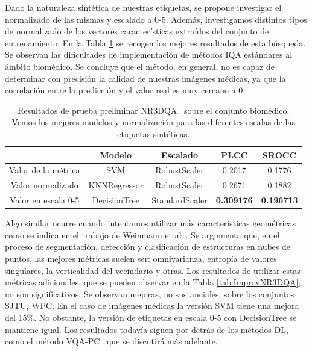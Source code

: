 Dado la naturaleza sintética de nuestras etiquetas, se propone investigar el 
normalizado de las mismas y escalado a 0-5. Además, investigamos distintos 
tipos de normalizado de los vectores características extraídos del conjunto de 
entrenamiento. En la Tabla \ref{tab:MedicalNR3DQA} se recogen los mejores 
resultados de esta búsqueda. 
Se observan las dificultades de implementación de métodos IQA estándares 
al ámbito biomédico. 
Se concluye que el método, en general, no es capaz de 
determinar con precisión la calidad de nuestras imágenes médicas, ya que la correlación 
entre la predicción y el valor real es muy cercano a 0.

\begin{table}[htp]
  \scriptsize
  \begin{center}
    \hspace{-.5cm}
    \begin{tabular}[c]{|c|c|c|c|c|}
      \hline
      \rowcolor[HTML]{FFC702}
      \multicolumn{1}{|c|}{\textbf{Etiqueta Sintética}} & 
      \multicolumn{1}{|c|}{\textbf{Modelo}} & 
      \multicolumn{1}{|c|}{\textbf{Escalado}} & 
      \multicolumn{1}{|c|}{\textbf{PLCC}} &
      \multicolumn{1}{|c|}{\textbf{SROCC}} \\
      \hline
      Valor de la métrica & SVM & RobustScaler & 0.2017 & 0.1776 \\
      \hline
      Valor normalizado & KNNRegressor & RobustScaler & 0.2671 & 0.1882  \\
      \hline
      Valor en escala 0-5 & DecisionTree & StandardScaler & \textbf{0.309176} & \textbf{0.196713} \\
      \hline
    \end{tabular}
  \end{center}
  \caption[Resultados de prueba preliminar NR3DQA sobre el conjunto biomédico.]
  {Resultados de prueba preliminar NR3DQA~\cite{NR3DQA} sobre el conjunto biomédico. 
  Vemos los mejores modelos y normalización para las diferentes escalas de las etiquetas sintéticas.
  }
  \label{tab:MedicalNR3DQA}
\end{table}

Algo similar ocurre cuando intentamos utilizar más características geométricas
como se indica en el trabajo de Weinmann et al~\cite{3DNSSMetrics}. Se argumenta que, en el proceso de segmentación, 
detección y clasificación de estructuras en nubes de puntos, 
las mejores métricas suelen ser: 
omnivarianza, entropía de valores singulares, la verticalidad del vecindario y 
otras. Los resultados de utilizar estas métricas adicionales, que 
se pueden observar en la Tabla \ref{tab:ImprovNR3DQA}, no son significativos.
Se observan mejoras, no sustanciales, sobre los conjuntos SJTU, WPC. 
En el caso de imágenes médicas la versión SVM tiene una mejora del 15\%. No obstante,
la versión de etiquetas en escala 0-5 con DecisionTree se mantiene igual.
Los resultados todavía siguen por detrás de los métodos DL, como el método VQA-PC~\cite{VQA-PC}
que se discutirá más adelante.

